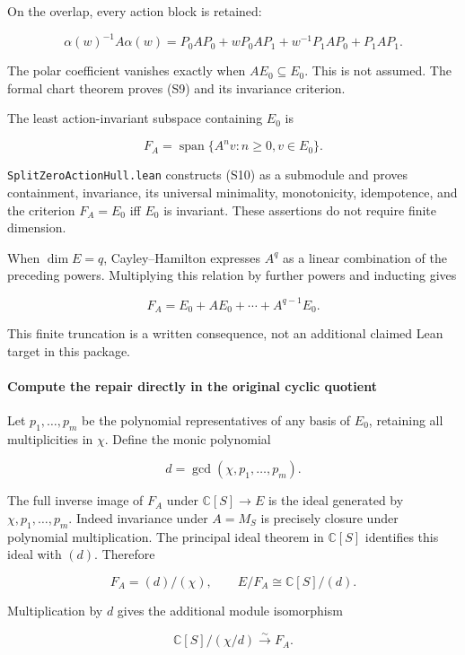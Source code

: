 On the overlap, every action block is retained:

\[
\alpha(w)^{-1}A\alpha(w)
=P_0AP_0+wP_0AP_1+w^{-1}P_1AP_0+P_1AP_1.
\tag{S9}
\]

The polar coefficient vanishes exactly when \(AE_0\subseteq E_0\). This is not assumed. The formal chart theorem proves (S9) and its invariance criterion.

The least action-invariant subspace containing \(E_0\) is

\[
F_A=\operatorname{span}\{A^nv:n\ge0,v\in E_0\}.
\tag{S10}
\]

\nolinkurl{SplitZeroActionHull.lean} constructs (S10) as a submodule and proves containment, invariance, its universal minimality, monotonicity, idempotence, and the criterion \(F_A=E_0\) iff \(E_0\) is invariant. These assertions do not require finite dimension.

When \(\dim E=q\), Cayley--Hamilton expresses \(A^q\) as a linear combination of the preceding powers. Multiplying this relation by further powers and inducting gives

\[
F_A=E_0+AE_0+\cdots+A^{q-1}E_0.
\tag{S11}
\]

This finite truncation is a written consequence, not an additional claimed Lean target in this package.

\paragraph{Compute the repair directly in the original cyclic quotient}\label{endpoint-cc_specialization--compute-the-repair-directly-in-the-original-cyclic-quotient}

Let \(p_1,\ldots,p_m\) be the polynomial representatives of any basis of \(E_0\), retaining all multiplicities in \(\chi\). Define the monic polynomial

\[
d=\gcd(\chi,p_1,\ldots,p_m).
\tag{S12}
\]

The full inverse image of \(F_A\) under \(\mathbb C[S]\to E\) is the ideal generated by \(\chi,p_1,\ldots,p_m\). Indeed invariance under \(A=M_S\) is precisely closure under polynomial multiplication. The principal ideal theorem in \(\mathbb C[S]\) identifies this ideal with \((d)\). Therefore

\[
\boxed{F_A=(d)/(\chi),\qquad E/F_A\cong\mathbb C[S]/(d).}
\tag{S13}
\]

Multiplication by \(d\) gives the additional module isomorphism

\[
\mathbb C[S]/(\chi/d)\xrightarrow{\sim}F_A.
\tag{S14}
\]

